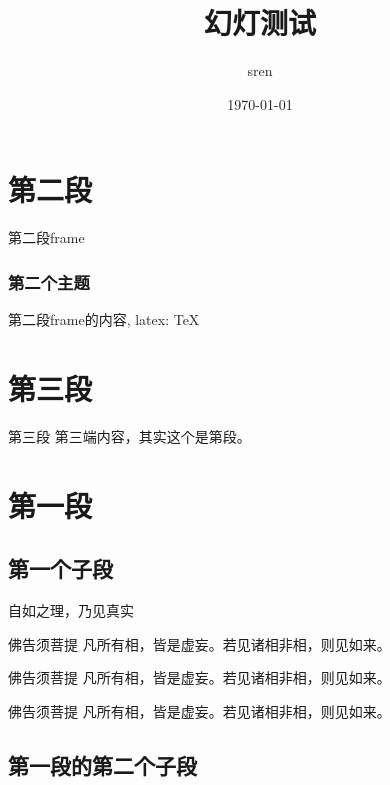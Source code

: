 \documentclass[]{beamer}
\begin{document}
\begin{frame}
  \title{幻灯测试}
  \author{sren}
  \date{\today}
  \maketitle
\end{frame}


\begin{frame}
  \normalsize
  \tableofcontents
\end{frame}





\section{第二段}
\frame{\tableofcontents[currentsection]}
\begin{frame}{第二段frame}
\frametitle[第二段的主题]{第二个主题}
  第二段frame的内容, latex: \TeX
\end{frame}

\section{第三段}
\frame{\tableofcontents[currentsection]}
\begin{frame}{第三段}
  第三端内容，其实这个是第\thesection 段。
\end{frame}

\section{第一段}
\subsection{第一个子段}
\frame{\tableofcontents[currentsection]}
\begin{frame}{自如之理，乃见真实}
  \pause %
  \begin{block}{佛告须菩提} 
    凡所有相，皆是虚妄。若见诸相非相，则见如来。 
  \end{block} 
  \pause
  \begin{alertblock}{佛告须菩提} 凡所有相，皆是虚妄。若见诸相非相，则见如来。 
  \end{alertblock} 
  \pause
  \begin {exampleblock}{佛告须菩提} 凡所有相，皆是虚妄。若见诸相非相，则见如来。 
  \end{exampleblock}
\end{frame}

\subsection{第一段的第二个子段}
\end{document}
